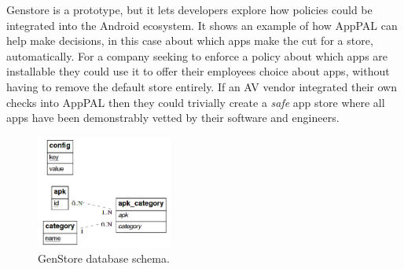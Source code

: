 \documentclass[thesis.tex]{subfiles}
\begin{document}
Genstore is a prototype, but it lets developers explore how policies could be
integrated into the Android ecosystem. It shows an example of how AppPAL can
help make decisions, in this case about which apps make the cut for a store,
automatically. For a company seeking to enforce a policy about which apps are
installable they could use it to offer their employees choice about apps,
without having to remove the default store entirely. If an AV vendor integrated
their own checks into AppPAL then they could trivially create a \emph{safe} app
store where all apps have been demonstrably vetted by their software and
engineers.

\begin{figure}\centering
  \includegraphics[width=0.4\textwidth]{figures/genstore-schema.png}
  \caption{GenStore database schema.}
  \label{fig:genstore-schema}
\end{figure}

\end{document}
